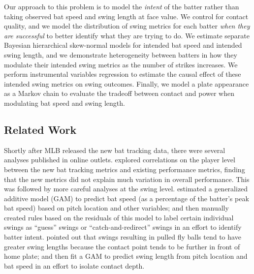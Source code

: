 \documentclass{article}
\begin{document}
    Our approach to this problem is to model the {\it intent} of the batter rather than taking observed bat speed and swing length at face value. We control for contact quality, and we model the distribution of swing metrics for each batter {\it when they are successful} to better identify what they are trying to do. We estimate separate Bayesian hierarchical skew-normal models for intended bat speed and intended swing length, and we demonstrate heterogeneity between batters in how they modulate their intended swing metrics as the number of strikes increases. We perform instrumental variables regression to estimate the causal effect of these intended swing metrics on swing outcomes. Finally, we model a plate appearance as a Markov chain to evaluate the tradeoff between contact and power when modulating bat speed and swing length.

    \subsection{Related Work}
    \label{sec:related-work}

      Shortly after MLB released the new bat tracking data, there were several analyses published in online outlets. \textcite{clemens_what_2024} explored correlations on the player level between the new bat tracking metrics and existing performance metrics, finding that the new metrics did not explain much variation in overall performance. This was followed by more careful analyses at the swing level. \textcite{woodward_radar_2024} estimated a generalized additive model (GAM) to predict bat speed (as a percentage of the batter's peak bat speed) based on pitch location and other variables; and then manually created rules based on the residuals of this model to label certain individual swings as ``guess'' swings or ``catch-and-redirect'' swings in an effort to identify batter intent. \textcite{orr_defense_2024} pointed out that swings resulting in pulled fly balls tend to have greater swing lengths because the contact point tends to be further in front of home plate; and then fit a GAM to predict swing length from pitch location and bat speed in an effort to isolate contact depth.
\end{document}
